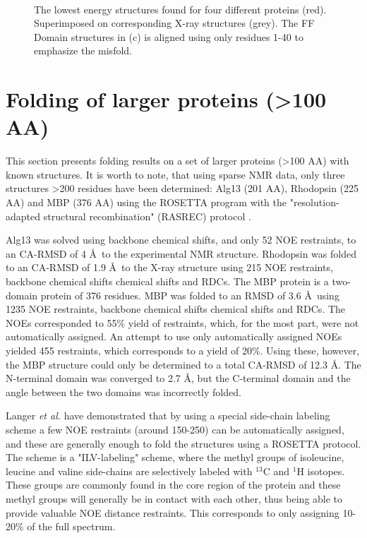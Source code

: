 \begin{figure}
{    }\\
    \caption{The lowest energy structures found for four different proteins (red). Superimposed on corresponding X-ray structures (grey). The FF Domain structures in (c) is aligned using only residues 1-40 to emphasize the misfold.}
    \label{fig:small_pics}%
\end{figure}



\clearpage

\section{Folding of larger proteins (\textgreater 100 AA)}

This section presents folding results on a set of larger proteins (\textgreater 100 AA) with known structures.
It is worth to note, that using sparse NMR data, only three structures \textgreater 200 residues have been determined: Alg13 (201 AA), Rhodopsin (225 AA) and MBP (376 AA) using the ROSETTA program with the "resolution-adapted structural recombination" (RASREC) protocol \cite{Lange2012,LangePNAS2012}.

Alg13 was solved using backbone chemical shifts, and only 52 NOE restraints, to an CA-RMSD of 4 \AA~to the experimental NMR structure.
Rhodopsin was folded to an CA-RMSD of 1.9 \AA~to the X-ray structure using 215 NOE restraints, backbone chemical shifts chemical shifts and RDCs.
The MBP protein is a two-domain protein of 376 residues.
MBP was folded to an RMSD of 3.6 \AA~using 1235 NOE restraints, backbone chemical shifts chemical shifts and RDCs.
The NOEs corresponded to 55\% yield of restraints, which, for the most part,  were not automatically assigned.
An attempt to use only automatically assigned NOEs yielded 455 restraints, which corresponds to a yield of 20\%. Using these, however, the MBP structure could only be determined to a total CA-RMSD of 12.3 \AA.
The N-terminal domain was converged to 2.7 \AA, but the C-terminal domain and the angle between the two domains was incorrectly folded.

Langer \textit{et al.} have demonstrated that by using a special side-chain labeling scheme a few NOE restraints (around 150-250) can be automatically assigned, and these are generally enough to fold the structures using a ROSETTA protocol\cite{LangePNAS2012}.
The scheme is a "ILV-labeling" scheme, where the methyl groups of isoleucine, leucine and valine side-chains are selectively labeled with $^{13}$C and $^1$H isotopes. These groups are commonly found in the core region of the protein and these methyl groups will generally be in contact with each other, thus being able to provide valuable NOE distance restraints. This corresponds to only assigning 10-20\% of the full spectrum.

